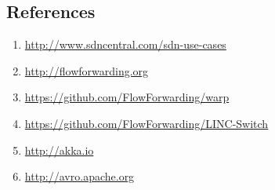 \documentclass[10pt, a5paper]{article}
\begin{document}
\subsection*{References}

\begin{enumerate}
  \item \url{http://www.sdncentral.com/sdn-use-cases}
  \item \url{http://flowforwarding.org}
  \item \url{https://github.com/FlowForwarding/warp}
  \item \url{https://github.com/FlowForwarding/LINC-Switch}
  \item \url{http://akka.io}
  \item \url{http://avro.apache.org}
\end{enumerate}
\end{document}
